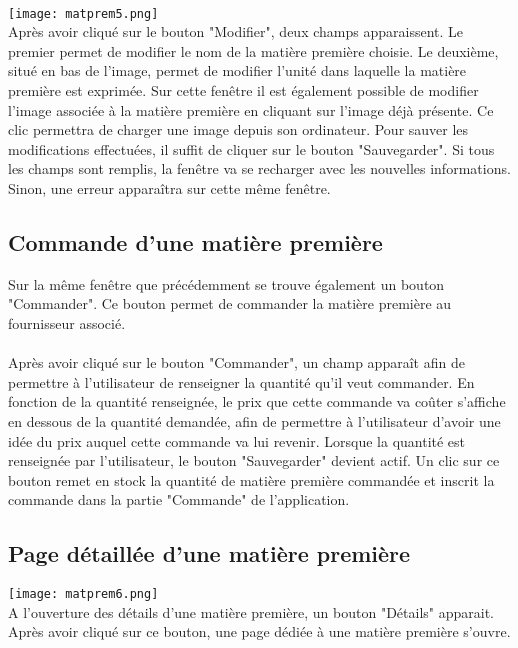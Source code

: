 \paragraph{}
\texttt{[image: matprem5.png]}\\
Après avoir cliqué sur le bouton "Modifier", deux champs apparaissent. Le
premier permet de modifier le nom de la matière première choisie. Le deuxième,
situé en bas de l'image, permet de modifier l'unité dans laquelle la matière
première est exprimée. Sur cette fenêtre il est également possible de modifier
l'image associée à la matière première en cliquant sur l'image déjà présente.
Ce clic permettra de charger une image depuis son ordinateur. Pour sauver les
modifications effectuées, il suffit de cliquer sur le bouton "Sauvegarder". Si
tous les champs sont remplis, la fenêtre va se recharger avec les nouvelles
informations. Sinon, une erreur apparaîtra sur cette même fenêtre.

\subsection{Commande d'une matière première}
Sur la même fenêtre que précédemment se trouve également un bouton "Commander".
Ce bouton permet de commander la matière première au fournisseur associé.

\paragraph{}
Après avoir cliqué sur le bouton "Commander", un champ apparaît afin de
permettre à l'utilisateur de renseigner la quantité qu'il veut commander.
En fonction de la quantité renseignée, le prix que cette commande va coûter
s'affiche en dessous de la quantité demandée, afin de permettre à l'utilisateur
d'avoir une idée du prix auquel cette commande va lui revenir. Lorsque la
quantité est renseignée par l'utilisateur, le bouton "Sauvegarder" devient
actif. Un clic sur ce bouton remet en stock la quantité de matière première
commandée et inscrit la commande dans la partie "Commande" de l'application.

\subsection{Page détaillée d'une matière première}
\texttt{[image: matprem6.png]}\\
A l'ouverture des détails d'une matière première, un bouton "Détails" apparait.
Après avoir cliqué sur ce bouton, une page dédiée à une matière première
s'ouvre.

